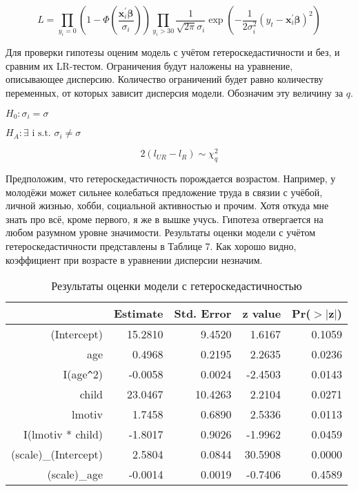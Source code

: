 \documentclass[a4paper,12pt]{article}
\begin{document}
\[ L=\prod_{y_{i}=0}\left(1-\Phi\left(\frac{\boldsymbol{x}_{i}^{\prime} \boldsymbol{\beta}}{\sigma_i}\right)\right) \prod_{y_{i}>30} \frac{1}{\sqrt{2 \pi} \sigma_i} \exp \left(-\frac{1}{2 \sigma_i^{2}}\left(y_{t}-\boldsymbol{x}_{i}^{\prime} \boldsymbol{\beta}\right)^{2}\right) \]
 

Для проверки гипотезы оценим модель с учётом гетероскедастичности и без, и сравним их LR-тестом. Ограничения будут наложены на уравнение, описывающее дисперсию. Количество ограничений будет равно количеству переменных, от которых зависит дисперсия модели. Обозначим эту величину за $ q $.

$ H_0: \sigma_i = \sigma $

$ H_A: \exists \text{ i s.t. } \sigma_i \neq \sigma $

\[ 2(l_{UR} - l_{R}) \sim \chi^2_q \]


Предположим, что гетероскедастичность порождается возрастом. Например, у молодёжи может сильнее колебаться предложение труда в связии с учёбой, личной жизнью, хобби, социальной активностью и прочим. Хотя откуда мне знать про всё, кроме первого, я же в вышке учусь. Гипотеза отвергается на любом разумном уровне значимости. Результаты оценки модели с учётом гетероскедастичности представлены в Таблице 7. Как хорошо видно, коэффициент при возрасте в уравнении дисперсии незначим.

\begin{table}[ht]
	\centering
	\begin{tabular}{|rrrrr|}
		\hline
		& Estimate & Std. Error & z value & Pr($>$$|$z$|$) \\ 
		\hline
		(Intercept) & 15.2810 & 9.4520 & 1.6167 & 0.1059 \\ 
		age & 0.4968 & 0.2195 & 2.2635 & 0.0236 \\ 
		I(age\verb|^|2) & -0.0058 & 0.0024 & -2.4503 & 0.0143 \\ 
		child & 23.0467 & 10.4263 & 2.2104 & 0.0271 \\ 
		lmotiv & 1.7458 & 0.6890 & 2.5336 & 0.0113 \\ 
		I(lmotiv * child) & -1.8017 & 0.9026 & -1.9962 & 0.0459 \\ 
		(scale)\_(Intercept) & 2.5804 & 0.0844 & 30.5908 & 0.0000 \\ 
		(scale)\_age & -0.0014 & 0.0019 & -0.7406 & 0.4589 \\ 
		\hline
	\end{tabular}
\caption{Результаты оценки модели с гетероскедастичностью}
\end{table}
\end{document}
